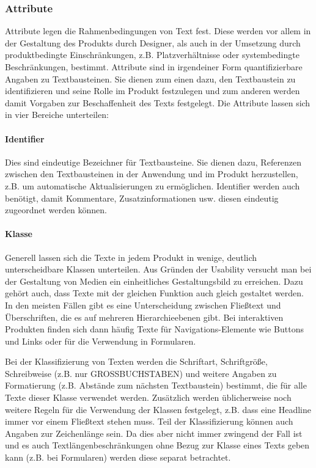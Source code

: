 \subsubsection{Attribute} 

Attribute legen die Rahmenbedingungen von Text fest. Diese werden vor allem in der Gestaltung des Produkts durch Designer, als auch in der Umsetzung durch produktbedingte Einschränkungen, z.B. Platzverhältnisse oder systembedingte Beschränkungen, bestimmt. Attribute sind in irgendeiner Form quantifizierbare Angaben zu Textbausteinen. Sie dienen zum einen dazu, den Textbaustein zu identifizieren und seine Rolle im Produkt festzulegen und zum anderen werden damit Vorgaben zur Beschaffenheit des Texts festgelegt. Die Attribute lassen sich in vier Bereiche unterteilen:

\paragraph{Identifier} Dies sind eindeutige Bezeichner für Textbausteine. Sie dienen dazu, Referenzen zwischen den Textbausteinen in der Anwendung und im Produkt herzustellen, z.B. um automatische Aktualisierungen zu ermöglichen. Identifier werden auch benötigt, damit Kommentare, Zusatzinformationen usw. diesen eindeutig zugeordnet werden können.

\paragraph{Klasse} Generell lassen sich die Texte in jedem Produkt in wenige, deutlich unterscheidbare Klassen unterteilen. Aus Gründen der Usability versucht man bei der Gestaltung von Medien ein einheitliches Gestaltungsbild zu erreichen. Dazu gehört auch, dass Texte mit der gleichen Funktion auch gleich gestaltet werden. In den meisten Fällen gibt es eine Unterscheidung zwischen Fließtext und Überschriften, die es auf mehreren Hierarchieebenen gibt. Bei interaktiven Produkten finden sich dann häufig Texte für Navigations-Elemente wie Buttons und Links oder für die Verwendung in Formularen. 

Bei der Klassifizierung von Texten werden die Schriftart, Schriftgröße, Schreibweise  (z.B. nur GROSSBUCHSTABEN) und weitere Angaben zu Formatierung (z.B. Abstände zum nächsten Textbaustein) bestimmt, die für alle Texte dieser Klasse verwendet werden. Zusätzlich werden üblicherweise noch weitere Regeln für die Verwendung der Klassen festgelegt, z.B. dass eine Headline immer vor einem Fließtext stehen muss. Teil der Klassifizierung können auch Angaben zur Zeichenlänge sein. Da dies aber nicht immer zwingend der Fall ist und es auch Textlängenbeschränkungen ohne Bezug zur Klasse eines Texts geben kann (z.B. bei Formularen) werden diese separat betrachtet.


